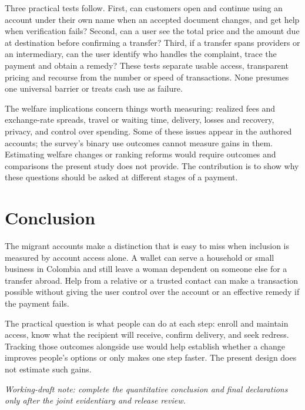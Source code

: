 \documentclass[12pt]{article}
\begin{document}
Three practical tests follow. First, can customers open and continue using an account under their own name when an accepted document changes, and get help when verification fails? Second, can a user see the total price and the amount due at destination before confirming a transfer? Third, if a transfer spans providers or an intermediary, can the user identify who handles the complaint, trace the payment and obtain a remedy? These tests separate usable access, transparent pricing and recourse from the number or speed of transactions. None presumes one universal barrier or treats cash use as failure.

The welfare implications concern things worth measuring: realized fees and exchange-rate spreads, travel or waiting time, delivery, losses and recovery, privacy, and control over spending. Some of these issues appear in the authored accounts; the survey's binary use outcomes cannot measure gains in them. Estimating welfare changes or ranking reforms would require outcomes and comparisons the present study does not provide. The contribution is to show why these questions should be asked at different stages of a payment.

\section{Conclusion}
The migrant accounts make a distinction that is easy to miss when inclusion is measured by account access alone. A wallet can serve a household or small business in Colombia and still leave a woman dependent on someone else for a transfer abroad. Help from a relative or a trusted contact can make a transaction possible without giving the user control over the account or an effective remedy if the payment fails.

The practical question is what people can do at each step: enroll and maintain access, know what the recipient will receive, confirm delivery, and seek redress. Tracking those outcomes alongside use would help establish whether a change improves people's options or only makes one step faster. The present design does not estimate such gains.

\emph{Working-draft note: complete the quantitative conclusion and final declarations only after the joint evidentiary and release review.}
\end{document}
